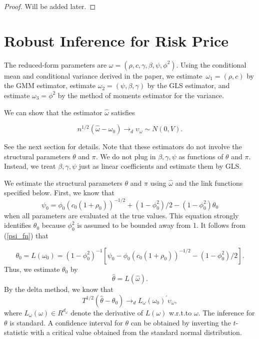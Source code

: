 \documentclass[11pt, letterpaper, twoside, final]{article}
\begin{document}
\begin{proof}
    Will be added later.
\end{proof}


\section{Robust Inference for Risk Price}

The reduced-form parameters are $\omega  = (\rho ,c,\gamma ,\beta ,\psi ,\phi ^{2})$. 
Using the conditional mean and conditional variance derived in the paper, we estimate $\, \omega_{1} = (\rho ,c)$
by the GMM estimator, estimate $\omega_{2} = (\psi ,\beta ,\gamma )$ by the GLS estimator, and estimate
$\omega_{3} = \phi^{2}$ by the method of moments estimator for the variance.

We can show that the estimator $\widehat{\omega}$ satisfies

\begin{equation}
    n^{1/2}(\widehat{\omega}-\omega_{0})\rightarrow_{d}\upsilon_{\omega}\sim N(0,V).
\end{equation}%

See the next section for details. 
Note that these estimators do not involve the structural parameters $\theta $ and $\pi$.
We do not plug in $\beta ,\gamma ,\psi $ as functions of $\theta $ and $\pi .$ Instead, we treat $\beta ,\gamma
,\psi $ just as linear coefficients and estimate them by GLS.

We estimate the structural parameters $\theta $ and $\pi $ using $\widehat{ \omega}$ and the link functions
specified below. 
First, we know that
%
\begin{equation}
    \label{psi_fn} 
    \psi_{0}=\phi_{0}\left( c_{0}\left( 1+\rho_{0}\right) \right) ^{-1/2}+\left( 1-\phi_{0}^{2}\right)
    /2-(1-\phi_{0}^{2})\theta_{0}
\end{equation}
%
when all parameters are evaluated at the true values. 
This equation strongly identifies $\theta_{0}$ because $\phi_{0}^{2}$ is assumed to be bounded away from 1. 
It follows from (\cref{psi_fn}) that

\begin{equation}
    \theta_{0}=L(\omega_{0})=(1-\phi_{0}^{2})^{-1}\left[ \psi_{0}-\phi_{0}\left( c_{0}\left( 1+\rho
   _{0}\right) \right) ^{-1/2}-\left( 1-\phi_{0}^{2}\right) /2\right] .
\end{equation}
%
Thus, we estimate $\theta_{0}$ by
%
\begin{equation}
    \widehat{\theta}=L(\widehat{\omega}).
\end{equation}
%
By the delta method, we know that
%
\begin{equation}
    T^{1/2}(\widehat{\theta}-\theta_{0})\rightarrow_{d}L_{\omega}(\omega_{0})^{\prime}\upsilon_{\omega},
\end{equation}
%
where $L_{\omega}(\omega )\in R^{d_{\omega}}$ denote the derivative of $L(\omega )$ w.r.t.\@ to $\omega$. 
The inference for $\theta $ is standard. 
A confidence interval for $\theta $ can be obtained by inverting the $t$-statistic with a critical value obtained
from the standard normal distribution.
\end{document}
